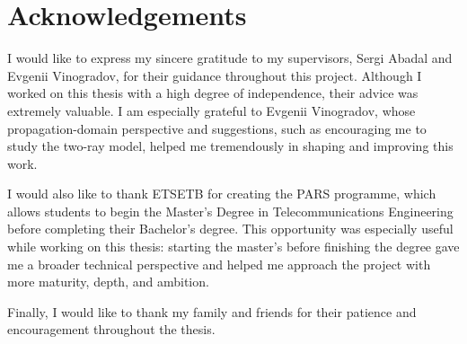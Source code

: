 \clearpage
\chapter*{Acknowledgements}
{}

I would like to express my sincere gratitude to my supervisors, Sergi Abadal and Evgenii Vinogradov, for their guidance throughout this project. Although I worked on this thesis with a high degree of independence, their advice was extremely valuable. I am especially grateful to Evgenii Vinogradov, whose propagation-domain perspective and suggestions, such as encouraging me to study the two-ray model, helped me tremendously in shaping and improving this work.

I would also like to thank ETSETB for creating the PARS programme, which allows students to begin the Master's Degree in Telecommunications Engineering before completing their Bachelor's degree. This opportunity was especially useful while working on this thesis: starting the master's before finishing the degree gave me a broader technical perspective and helped me approach the project with more maturity, depth, and ambition.

Finally, I would like to thank my family and friends for their patience and encouragement throughout the thesis.
